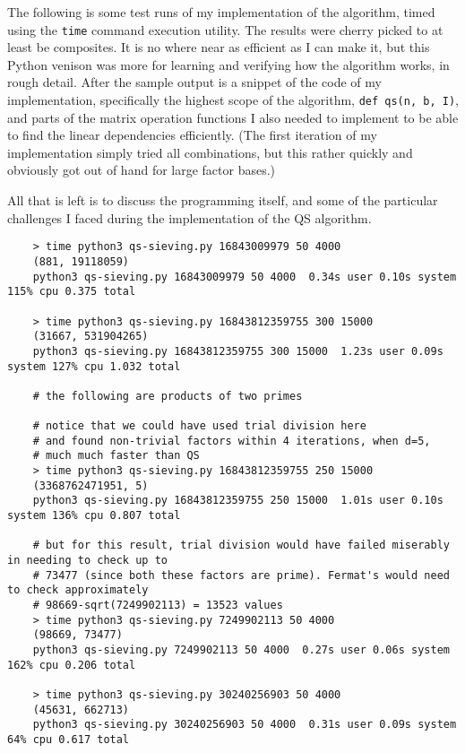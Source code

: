\documentclass{report}
\begin{document}
The following is some test runs of my implementation of the algorithm, timed using the
\texttt{time} command execution utility. The results were cherry picked to at least
be composites.
It is no where near as efficient as I can make it, but this Python venison was more for learning
and verifying how the algorithm works, in rough detail.
After the sample output is a snippet of the code of my implementation, specifically the highest
scope of the algorithm, \texttt{def qs(n, b, I)}, and parts of the matrix operation
functions I also needed to implement to be able to find the linear dependencies efficiently.
(The first iteration of my implementation simply tried all combinations, but this rather quickly
and obviously got out of hand for large factor bases.)

All that is left is to discuss the programming itself, and some of the particular challenges I faced
during the implementation of the QS algorithm.
\begin{verbatim}
    > time python3 qs-sieving.py 16843009979 50 4000
    (881, 19118059)
    python3 qs-sieving.py 16843009979 50 4000  0.34s user 0.10s system 115% cpu 0.375 total

    > time python3 qs-sieving.py 16843812359755 300 15000
    (31667, 531904265)
    python3 qs-sieving.py 16843812359755 300 15000  1.23s user 0.09s system 127% cpu 1.032 total

    # the following are products of two primes

    # notice that we could have used trial division here
    # and found non-trivial factors within 4 iterations, when d=5,
    # much much faster than QS
    > time python3 qs-sieving.py 16843812359755 250 15000
    (3368762471951, 5)
    python3 qs-sieving.py 16843812359755 250 15000  1.01s user 0.10s system 136% cpu 0.807 total

    # but for this result, trial division would have failed miserably in needing to check up to
    # 73477 (since both these factors are prime). Fermat's would need to check approximately
    # 98669-sqrt(7249902113) = 13523 values
    > time python3 qs-sieving.py 7249902113 50 4000
    (98669, 73477)
    python3 qs-sieving.py 7249902113 50 4000  0.27s user 0.06s system 162% cpu 0.206 total

    > time python3 qs-sieving.py 30240256903 50 4000
    (45631, 662713)
    python3 qs-sieving.py 30240256903 50 4000  0.31s user 0.09s system 64% cpu 0.617 total
\end{verbatim}
\pagebreak
\end{document}
